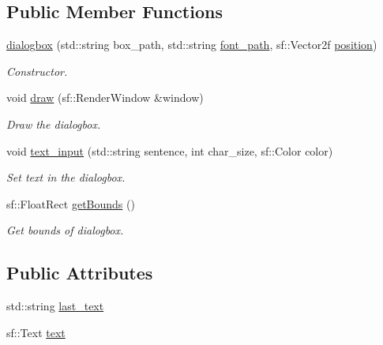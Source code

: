 \subsection*{Public Member Functions}
\begin{DoxyCompactItemize}
\item 
\hyperlink{classdialogbox_a44b14d7932ab0866ba2d3708d406bfb7}{dialogbox} (std\+::string box\+\_\+path, std\+::string \hyperlink{classdialogbox_a11fd386b5bb381072262a574ea25c8c3}{font\+\_\+path}, sf\+::\+Vector2f \hyperlink{classdialogbox_a05031b5d9149389d301638da9005e744}{position})
\begin{DoxyCompactList}\small\item\em Constructor. \end{DoxyCompactList}\item 
void \hyperlink{classdialogbox_a722438dee05d120c77871b1ec9d26cf5}{draw} (sf\+::\+Render\+Window \&window)
\begin{DoxyCompactList}\small\item\em Draw the dialogbox. \end{DoxyCompactList}\item 
void \hyperlink{classdialogbox_ab9d8f8b65c3a54ccaea57a941d43a176}{text\+\_\+input} (std\+::string sentence, int char\+\_\+size, sf\+::\+Color color)
\begin{DoxyCompactList}\small\item\em Set text in the dialogbox. \end{DoxyCompactList}\item 
sf\+::\+Float\+Rect \hyperlink{classdialogbox_aeb83bd7a568feeb4be10a0335838ae2a}{get\+Bounds} ()
\begin{DoxyCompactList}\small\item\em Get bounds of dialogbox. \end{DoxyCompactList}\end{DoxyCompactItemize}
\subsection*{Public Attributes}
\begin{DoxyCompactItemize}
\item 
std\+::string \hyperlink{classdialogbox_a227a4bab170830377e3b954c80341570}{last\+\_\+text}
\item 
sf\+::\+Text \hyperlink{classdialogbox_a710d3c7c4f21676a560d6825ff22a152}{text}
\end{DoxyCompactItemize}
